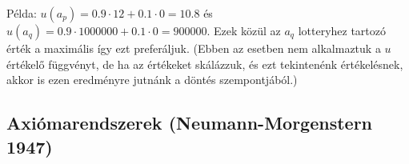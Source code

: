 \documentclass[a4paper,12pt]{article}
\begin{document}
Példa: $u(a_p)= 0.9\cdot 12 + 0.1\cdot 0 = 10.8$ és $u(a_q)= 0.9\cdot 1000000 + 0.1\cdot 0 = 900000$. Ezek közül az $a_q$ lotteryhez tartozó érték a maximális így ezt preferáljuk. (Ebben az esetben nem alkalmaztuk a $u$ értékelő függvényt, de ha az értékeket skálázzuk, és ezt tekintenénk értékelésnek, akkor is ezen eredményre jutnánk a döntés szempontjából.)

\subsection{Axiómarendszerek (Neumann-Morgenstern 1947)} 



\end{document}
